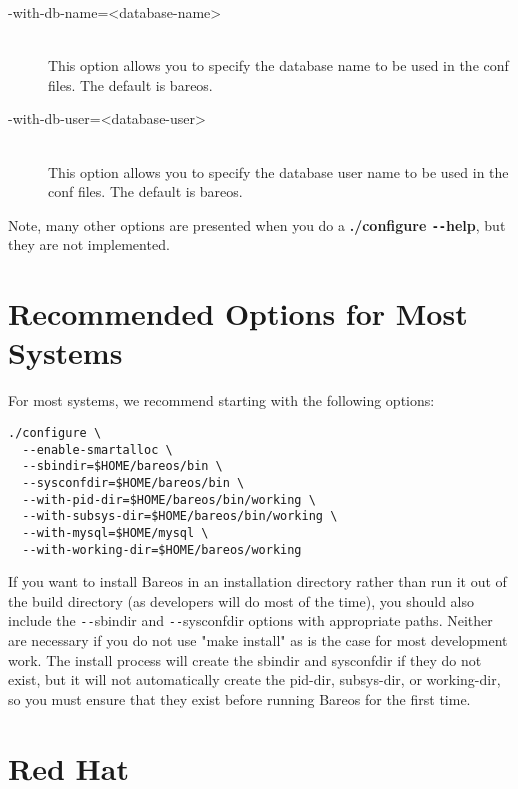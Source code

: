 \begin{description}
\item [ {-}{\-}with-db-name={\textless}database-name{\textgreater}] \hfill \\
This option allows you to specify the database name to be used in
the conf files.  The default is bareos.

\item [ {-}{\-}with-db-user={\textless}database-user{\textgreater}] \hfill \\
This option allows you to specify the database user name to be used in
the conf files.  The default is bareos.

\end{description}

Note, many other options are presented when you do a {\bf ./configure
\verb:--:help}, but they are not implemented.

\section{Recommended Options for Most Systems}

For most systems, we recommend starting with the following options:

\footnotesize
\begin{verbatim}
./configure \
  --enable-smartalloc \
  --sbindir=$HOME/bareos/bin \
  --sysconfdir=$HOME/bareos/bin \
  --with-pid-dir=$HOME/bareos/bin/working \
  --with-subsys-dir=$HOME/bareos/bin/working \
  --with-mysql=$HOME/mysql \
  --with-working-dir=$HOME/bareos/working
\end{verbatim}
\normalsize

If you want to install Bareos in an installation directory rather than run it
out of the build directory (as developers will do most of the time), you
should also include the \verb:--:sbindir and \verb:--:sysconfdir options with appropriate
paths. Neither are necessary if you do not use "make install" as is the case
for most development work. The install process will create the sbindir and
sysconfdir if they do not exist, but it will not automatically create the
pid-dir, subsys-dir, or working-dir, so you must ensure that they exist before
running Bareos for the first time.

\section{Red Hat}
\index[general]{Red Hat}

